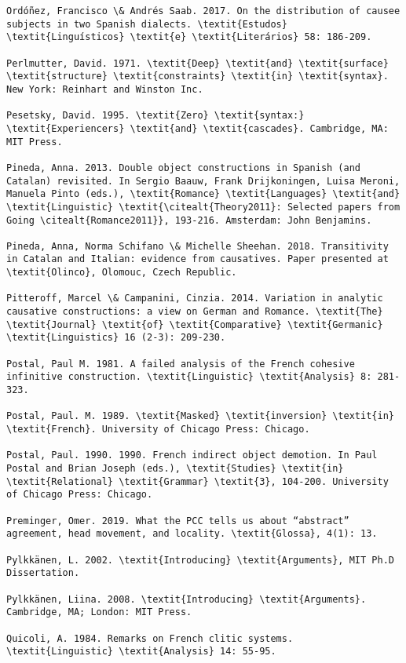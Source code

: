\documentclass[output=paper,modfonts,nonflat]{langsci/langscibook}
\begin{document}
\begin{verbatim}
Ordóñez, Francisco \& Andrés Saab. 2017. On the distribution of causee subjects in two Spanish dialects. \textit{Estudos} \textit{Linguísticos} \textit{e} \textit{Literários} 58: 186-209. 

Perlmutter, David. 1971. \textit{Deep} \textit{and} \textit{surface} \textit{structure} \textit{constraints} \textit{in} \textit{syntax}. New York: Reinhart and Winston Inc. 

Pesetsky, David. 1995. \textit{Zero} \textit{syntax:} \textit{Experiencers} \textit{and} \textit{cascades}. Cambridge, MA: MIT Press.

Pineda, Anna. 2013. Double object constructions in Spanish (and Catalan) revisited. In Sergio Baauw, Frank Drijkoningen, Luisa Meroni, Manuela Pinto (eds.), \textit{Romance} \textit{Languages} \textit{and} \textit{Linguistic} \textit{\citealt{Theory2011}: Selected papers from Going \citealt{Romance2011}}, 193-216. Amsterdam: John Benjamins. 

Pineda, Anna, Norma Schifano \& Michelle Sheehan. 2018. Transitivity in Catalan and Italian: evidence from causatives. Paper presented at \textit{Olinco}, Olomouc, Czech Republic. 

Pitteroff, Marcel \& Campanini, Cinzia. 2014. Variation in analytic causative constructions: a view on German and Romance. \textit{The} \textit{Journal} \textit{of} \textit{Comparative} \textit{Germanic} \textit{Linguistics} 16 (2-3): 209-230.

Postal, Paul M. 1981. A failed analysis of the French cohesive infinitive construction. \textit{Linguistic} \textit{Analysis} 8: 281-323.

Postal, Paul. M. 1989. \textit{Masked} \textit{inversion} \textit{in} \textit{French}. University of Chicago Press: Chicago. 

Postal, Paul. 1990. 1990. French indirect object demotion. In Paul Postal and Brian Joseph (eds.), \textit{Studies} \textit{in} \textit{Relational} \textit{Grammar} \textit{3}, 104-200. University of Chicago Press: Chicago.

Preminger, Omer. 2019. What the PCC tells us about “abstract” agreement, head movement, and locality. \textit{Glossa}, 4(1): 13. 

Pylkkänen, L. 2002. \textit{Introducing} \textit{Arguments}, MIT Ph.D Dissertation. 

Pylkkänen, Liina. 2008. \textit{Introducing} \textit{Arguments}. Cambridge, MA; London: MIT Press.

Quicoli, A. 1984. Remarks on French clitic systems. \textit{Linguistic} \textit{Analysis} 14: 55-95.


\end{verbatim}
\end{document}

